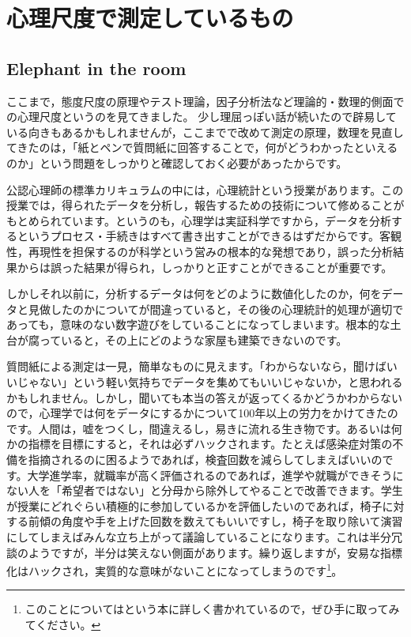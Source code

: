 \documentclass{ltjsbook}
\begin{document}
\chapter{心理尺度で測定しているもの}
\label{H06_Attitude}
\section{Elephant in the room}
ここまで，態度尺度の原理やテスト理論，因子分析法など理論的・数理的側面での心理尺度というのを見てきました。
少し理屈っぽい話が続いたので辟易している向きもあるかもしれませんが，ここまでで改めて測定の原理，数理を見直してきたのは，「紙とペンで質問紙に回答することで，何がどうわかったといえるのか」という問題をしっかりと確認しておく必要があったからです。

公認心理師の標準カリキュラムの中には，心理統計という授業があります。この授業では，得られたデータを分析し，報告するための技術について修めることがもとめられています。というのも，心理学は実証科学ですから，データを分析するというプロセス・手続きはすべて書き出すことができるはずだからです。客観性，再現性を担保するのが科学という営みの根本的な発想であり，誤った分析結果からは誤った結果が得られ，しっかりと正すことができることが重要です。

しかしそれ以前に，分析するデータは何をどのように数値化したのか，何をデータと見做したのかについてが間違っていると，その後の心理統計的処理が適切であっても，意味のない数字遊びをしていることになってしまいます。根本的な土台が腐っていると，その上にどのような家屋も建築できないのです。

質問紙による測定は一見，簡単なものに見えます。「わからないなら，聞けばいいじゃない」という軽い気持ちでデータを集めてもいいじゃないか，と思われるかもしれません。しかし，聞いても本当の答えが返ってくるかどうかわからないので，心理学では何をデータにするかについて100年以上の労力をかけてきたのです。人間は，嘘をつくし，間違えるし，易きに流れる生き物です。あるいは何かの指標を目標にすると，それは必ずハックされます。たとえば感染症対策の不備を指摘されるのに困るようであれば，検査回数を減らしてしまえばいいのです。大学進学率，就職率が高く評価されるのであれば，進学や就職ができそうにない人を「希望者ではない」と分母から除外してやることで改善できます。学生が授業にどれぐらい積極的に参加しているかを評価したいのであれば，椅子に対する前傾の角度や手を上げた回数を数えてもいいですし，椅子を取り除いて演習にしてしまえばみんな立ち上がって議論していることになります。これは半分冗談のようですが，半分は笑えない側面があります。繰り返しますが，安易な指標化はハックされ，実質的な意味がないことになってしまうのです\footnote{このことについては\textcite{Jerry2019}という本に詳しく書かれているので，ぜひ手に取ってみてください。}。
\end{document}
